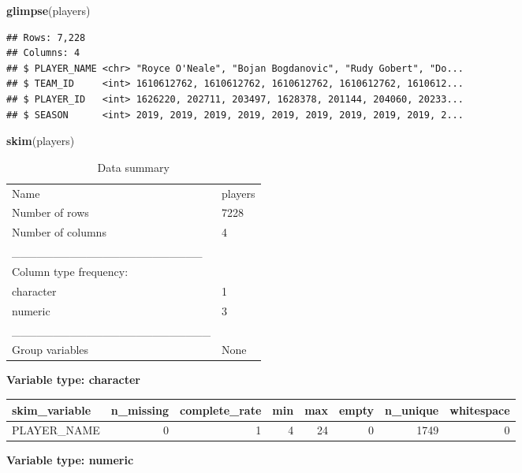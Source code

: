 \documentclass[
]{article}
\newenvironment{Shaded}{\begin{snugshade}}{\end{snugshade}}
\newcommand{\KeywordTok}[1]{\textcolor[rgb]{0.13,0.29,0.53}{\textbf{#1}}}
\newcommand{\NormalTok}[1]{#1}
\begin{document}
\begin{Shaded}
\begin{Highlighting}[]
\KeywordTok{glimpse}\NormalTok{(players)}
\end{Highlighting}
\end{Shaded}

\begin{verbatim}
## Rows: 7,228
## Columns: 4
## $ PLAYER_NAME <chr> "Royce O'Neale", "Bojan Bogdanovic", "Rudy Gobert", "Do...
## $ TEAM_ID     <int> 1610612762, 1610612762, 1610612762, 1610612762, 1610612...
## $ PLAYER_ID   <int> 1626220, 202711, 203497, 1628378, 201144, 204060, 20233...
## $ SEASON      <int> 2019, 2019, 2019, 2019, 2019, 2019, 2019, 2019, 2019, 2...
\end{verbatim}

\begin{Shaded}
\begin{Highlighting}[]
\KeywordTok{skim}\NormalTok{(players)}
\end{Highlighting}
\end{Shaded}

\begin{longtable}[]{@{}ll@{}}
\caption{Data summary}\tabularnewline
\toprule
\endhead
Name & players\tabularnewline
Number of rows & 7228\tabularnewline
Number of columns & 4\tabularnewline
\_\_\_\_\_\_\_\_\_\_\_\_\_\_\_\_\_\_\_\_\_\_\_ &\tabularnewline
Column type frequency: &\tabularnewline
character & 1\tabularnewline
numeric & 3\tabularnewline
\_\_\_\_\_\_\_\_\_\_\_\_\_\_\_\_\_\_\_\_\_\_\_\_ &\tabularnewline
Group variables & None\tabularnewline
\bottomrule
\end{longtable}

\textbf{Variable type: character}

\begin{longtable}[]{@{}lrrrrrrr@{}}
\toprule
skim\_variable & n\_missing & complete\_rate & min & max & empty &
n\_unique & whitespace\tabularnewline
\midrule
\endhead
PLAYER\_NAME & 0 & 1 & 4 & 24 & 0 & 1749 & 0\tabularnewline
\bottomrule
\end{longtable}

\textbf{Variable type: numeric}
\end{document}
